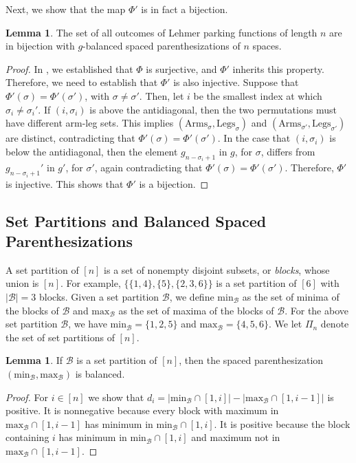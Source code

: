 \documentclass{amsart}
\newcommand{\mB}{\mathcal B}
\newcommand{\minB}{\mathrm{min}_\mB}
\newcommand{\maxB}{\mathrm{max}_\mB}
\newcommand{\arms}{\mathrm{Arms}}
\newcommand{\legs}{\mathrm{Legs}}
\theoremstyle{definition}
\newtheorem{lemma}[theorem]{Lemma}
\theoremstyle{definition}
\theoremstyle{remark}
\begin{document}
Next, we show that the map $\Phi'$ is in fact a bijection.

\begin{lemma}\label{lem:ITO <-> BSP}
    The set of all outcomes of Lehmer parking functions of length $n$ are in bijection with $g$-balanced spaced parenthesizations of $n$ spaces.
\end{lemma}
\begin{proof}
In , we established that $\Phi$ is surjective, and $\Phi'$ inherits this property. Therefore, we need to establish that $\Phi'$ is also injective.
Suppose that $\Phi'(\sigma)=\Phi'(\sigma')$, with $\sigma\neq \sigma'$.
Then, let
$i$ be the smallest index at which $\sigma_i\neq \sigma_i'$.
If $(i,\sigma_i)$ is above the antidiagonal, then the two permutations must have different arm-leg sets.
This implies $(\arms_\sigma,\legs_\sigma)$ and $(\arms_{\sigma'},\legs_{\sigma'})$ are distinct, contradicting that $\Phi'(\sigma)=\Phi'(\sigma')$.
In the case that $(i,\sigma_i)$ is below the antidiagonal, then the element $g_{n-\sigma_i+1}$ in $g$, for $\sigma$, differs from  $g_{n-\sigma_i+1}'$ in $g'$, for $\sigma'$, again contradicting that 
$\Phi'(\sigma)=\Phi'(\sigma')$.
Therefore, $\Phi'$ is injective.
This shows that $\Phi'$ is a bijection.
\end{proof}


\subsection{Set Partitions and Balanced Spaced Parenthesizations}\label{sec:setpartition}
A set partition of $[n]$ is a set of nonempty disjoint subsets, or \textit{blocks}, whose union is $[n]$. For example, $\{\{1,4\},\{5\},\{2,3,6\}\}$ is a set partition of $[6]$ with $|\mB|=3$ blocks. 
Given a set partition $\mB$, we define $\minB$ as the set of minima of the blocks of $\mB$ and $\maxB$ as the set of maxima of the blocks of $\mB$. 
For the above set partition $\mB$, we have $\minB=\{1,2,5\}$ and $\maxB=\{4,5,6\}$. 
We let $\Pi_n$ denote the set of set partitions of $[n]$.


\begin{lemma}\label{lem:set partitions are balanced}
    If $\mB$ is a set partition of $[n]$, then the spaced parenthesization $(\minB,\maxB)$ is balanced.
\end{lemma}
\begin{proof}
    For $i\in[n]$ we show that $d_i=|\minB\cap[1,i]|-|\maxB\cap[1,i-1]|$ is positive. It is nonnegative because every block with maximum in $\maxB\cap[1,i-1]$ has minimum in $\minB\cap[1,i]$. It is positive because the block containing $i$ has minimum in $\minB\cap[1,i]$ and maximum not in $\maxB\cap[1,i-1]$.
\end{proof}
\end{document}
